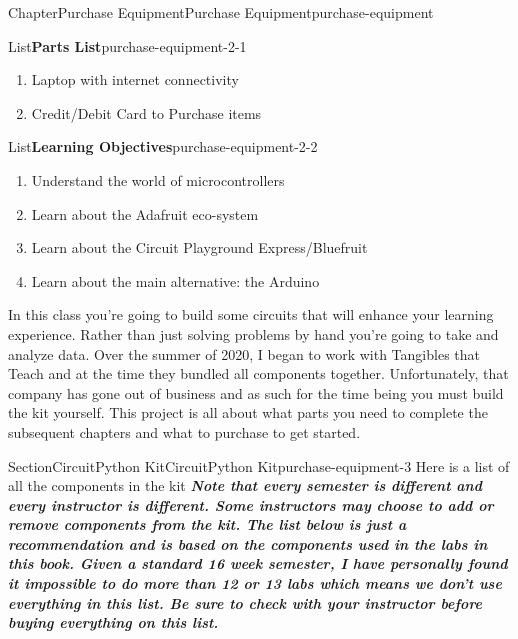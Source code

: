 \documentclass[oneside,10pt,]{book}
\newcommand{\alert}[1]{\textbf{\textit{#1}}}
\numberwithin{equation}{section}
\begin{document}
\begin{chapterptx}{Chapter}{Purchase Equipment}{}{Purchase Equipment}{}{}{purchase-equipment}
\renewcommand*{\chaptername}{Chapter}
\begin{introduction}{}%
\begin{listptx}{List}{\textbf{Parts List}}{purchase-equipment-2-1}{}%
%
\begin{enumerate}
\item{}Laptop with internet connectivity%
\item{}Credit\slash{}Debit Card to Purchase items%
\end{enumerate}
\end{listptx}%
\begin{listptx}{List}{\textbf{Learning Objectives}}{purchase-equipment-2-2}{}%
%
\begin{enumerate}
\item{}Understand the world of microcontrollers%
\item{}Learn about the Adafruit eco-system%
\item{}Learn about the Circuit Playground Express\slash{}Bluefruit%
\item{}Learn about the main alternative: the Arduino%
\end{enumerate}
\end{listptx}%
In this class you're going to build some circuits that will enhance your learning experience. Rather than just solving problems by hand you're going to take and analyze data. Over the summer of 2020, I began to work with Tangibles that Teach and at the time they bundled all components together. Unfortunately, that company has gone out of business and as such for the time being you must build the kit yourself. This project is all about what parts you need to complete the subsequent chapters and what to purchase to get started.%
\end{introduction}%
%
%
\typeout{************************************************}
\typeout{************************************************}
%
\begin{sectionptx}{Section}{CircuitPython Kit}{}{CircuitPython Kit}{}{}{purchase-equipment-3}
Here is a list of all the components in the kit \alert{Note that every semester is different and every instructor is different. Some instructors may choose to add or remove components from the kit. The list below is just a recommendation and is based on the components used in the labs in this book. Given a standard 16 week semester, I have personally found it impossible to do more than 12 or 13 labs which means we don't use everything in this list. Be sure to check with your instructor before buying everything on this list.}%

\end{sectionptx}
\end{chapterptx}
\end{document}
